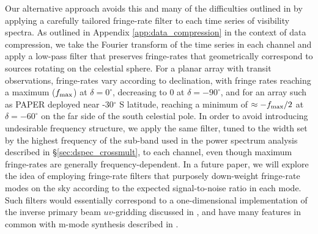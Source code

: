 \documentclass[twocolumn,apj,numberedappendix]{emulateapj}
\begin{document}
Our alternative approach avoids this and many of the difficulties outlined
in \citet{hazelton_et_al2013} by applying a carefully tailored
fringe-rate filter to each time series of visibility spectra.  As outlined in Appendix \ref{app:data_compression}
in the context of data compression, we
take the Fourier transform of the time series in each channel and apply a low-pass filter that preserves
fringe-rates that geometrically correspond to sources rotating on the celestial sphere.  
For a planar array with transit observations, fringe-rates vary according to declination, with fringe rates
reaching a maximum ($f_{\rm max}$) at 
$\delta=0^\circ$, decreasing to 0 at $\delta=-90^\circ$, and for an array such as PAPER deployed near
-30$^\circ$ S latitude, reaching a minimum of $\approx-f_{\rm max}/2$ at $\delta=-60^\circ$ on
the far side of the south celestial pole.
In order to
avoid introducing undesirable frequency structure, we apply the same filter, tuned to the width
set by the highest frequency of the sub-band used in the
power spectrum analysis described
in \S\ref{sec:dspec_crossmult}, to each channel,
even though maximum fringe-rates are generally frequency-dependent.
In a future paper, we will explore the idea
of employing fringe-rate filters that purposely down-weight fringe-rate modes on the sky according to
the expected signal-to-noise ratio in each mode.  Such filters would essentially correspond to a
one-dimensional implementation of the inverse primary beam $uv$-gridding discussed in \citet{morales_matejek2009},
and have many features in common with m-mode synthesis described in \citet{shaw_et_al2013}.
\end{document}
